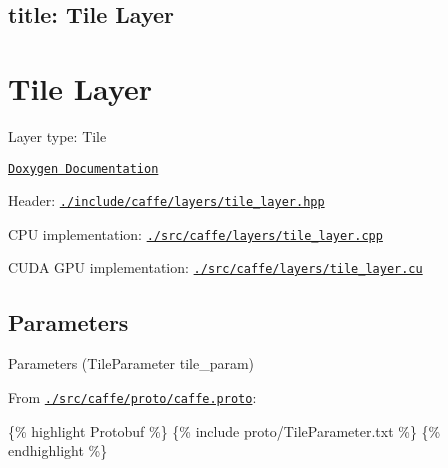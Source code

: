 

 \subsection*{title\+: Tile Layer }

\section*{Tile Layer}


\begin{DoxyItemize}
\item Layer type\+: {\ttfamily Tile}
\item \href{http://caffe.berkeleyvision.org/doxygen/classcaffe_1_1TileLayer.html}{\tt Doxygen Documentation}
\item Header\+: \href{https://github.com/BVLC/caffe/blob/master/include/caffe/layers/tile_layer.hpp}{\tt {\ttfamily ./include/caffe/layers/tile\+\_\+layer.hpp}}
\item C\+PU implementation\+: \href{https://github.com/BVLC/caffe/blob/master/src/caffe/layers/tile_layer.cpp}{\tt {\ttfamily ./src/caffe/layers/tile\+\_\+layer.cpp}}
\item C\+U\+DA G\+PU implementation\+: \href{https://github.com/BVLC/caffe/blob/master/src/caffe/layers/tile_layer.cu}{\tt {\ttfamily ./src/caffe/layers/tile\+\_\+layer.cu}}
\end{DoxyItemize}

\subsection*{Parameters}


\begin{DoxyItemize}
\item Parameters ({\ttfamily Tile\+Parameter tile\+\_\+param})
\item From \href{https://github.com/BVLC/caffe/blob/master/src/caffe/proto/caffe.proto}{\tt {\ttfamily ./src/caffe/proto/caffe.proto}}\+:
\end{DoxyItemize}

\{\% highlight Protobuf \%\} \{\% include proto/\+Tile\+Parameter.\+txt \%\} \{\% endhighlight \%\} 